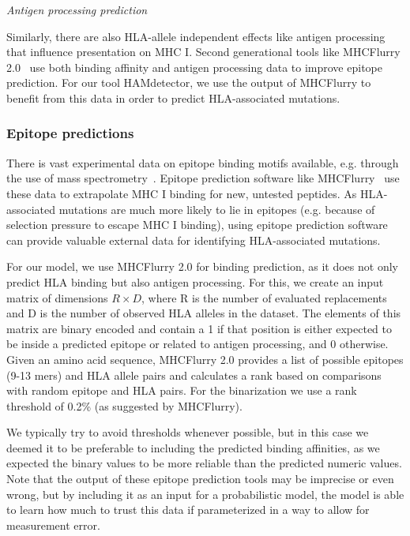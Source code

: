 \documentclass{bioinfo}
\begin{document}
\begin{methods}
  \textit{Antigen processing prediction}
  
    Similarly, there are also HLA-allele independent effects like antigen processing that influence presentation on MHC I. Second generational tools like MHCFlurry 2.0~\citep{ODonnell2020} use both binding affinity and antigen processing data to improve epitope prediction. For our tool HAMdetector, we use the output of MHCFlurry to benefit from this data in order to predict HLA-associated mutations.

    \subsubsection{Epitope predictions}

There is vast experimental data on epitope binding motifs available, e.g. through the use of mass spectrometry~\citep{Hunt1992}. Epitope prediction software like MHCFlurry~\citep{ODonnell2020} use these data to extrapolate MHC I binding for new, untested peptides.
As HLA-associated mutations are much more likely to lie in epitopes (e.g. because of selection pressure to escape MHC I binding), using epitope prediction software can provide valuable external data for identifying HLA-associated mutations.

For our model, we use MHCFlurry 2.0 for binding prediction, as it does not only predict HLA binding but also antigen processing. For this, we create an input matrix of dimensions \(R\times D\), where R is the number of evaluated replacements and D is the number of observed HLA alleles in the dataset. The elements of this matrix are binary encoded and contain a 1 if that position is either expected to be inside a predicted epitope or related to antigen processing, and 0 otherwise. Given an amino acid sequence, MHCFlurry 2.0 provides a list of possible epitopes (9-13 mers) and HLA allele pairs and calculates a rank based on comparisons with random epitope and HLA pairs. For the binarization we use a rank threshold of 0.2\% (as suggested by MHCFlurry).

We typically try to avoid thresholds whenever possible, but in this case we deemed it to be preferable to including the predicted binding affinities, as we expected the binary values to be more reliable than the predicted numeric values.
Note that the output of these epitope prediction tools may be imprecise or even wrong, but by including it as an input for a probabilistic model, the model is able to learn how much to trust this data if parameterized in a way to allow for measurement error.


\end{methods}
\end{document}
